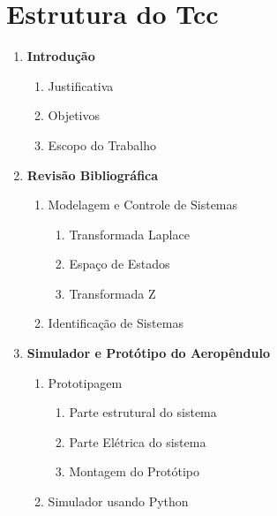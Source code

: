 \documentclass[12pt,oneside,a4paper,brazil]{article}
\begin{document}
	\renewcommand{\labelenumii}{\arabic{enumi}.\arabic{enumii}}
	\renewcommand{\labelenumiii}{\arabic{enumi}.\arabic{enumii}.\arabic{enumiii}}
	\renewcommand{\labelenumiv}{\arabic{enumi}.\arabic{enumii}.\arabic{enumiii}.\arabic{enumiv}}
	\section*{Estrutura do Tcc}
	\color{normal}
	
	\begin{enumerate}
		\item \textbf{Introdução}
		\begin{enumerate}
			\item Justificativa
			\item Objetivos
			\item Escopo do Trabalho
		\end{enumerate}


		\item \textbf{Revisão Bibliográfica}
		\begin{enumerate}
			\item Modelagem e Controle de Sistemas
			\begin{enumerate}
				\item Transformada Laplace
				\item Espaço de Estados
				\item Transformada Z
			\end{enumerate}
			\item Identificação de Sistemas
		\end{enumerate}


		\item \textbf{Simulador e Protótipo do Aeropêndulo}
		\begin{enumerate}
			\item Prototipagem
			\begin{enumerate}
				\item Parte estrutural do sistema
				\item Parte Elétrica do sistema
				\item Montagem do Protótipo
			\end{enumerate}
			\item Simulador usando Python
		\end{enumerate}
	

\end{enumerate}
\end{document}
